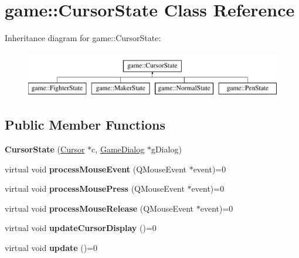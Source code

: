 \hypertarget{classgame_1_1CursorState}{}\section{game\+:\+:Cursor\+State Class Reference}
\label{classgame_1_1CursorState}
Inheritance diagram for game\+:\+:Cursor\+State\+:\begin{figure}[H]
\begin{center}
\leavevmode
\includegraphics[height=2.000000cm]{classgame_1_1CursorState}
\end{center}
\end{figure}
\subsection*{Public Member Functions}
\begin{DoxyCompactItemize}
\item 
\mbox{\label{classgame_1_1CursorState_acd2a923f1ab53c7e89343fcf68afb090}} 
{\bfseries Cursor\+State} (\hyperlink{classgame_1_1Cursor}{Cursor} $\ast$c, \hyperlink{classgame_1_1GameDialog}{Game\+Dialog} $\ast$g\+Dialog)
\item 
\mbox{\label{classgame_1_1CursorState_aae2cb6cb2261d9a4c5919ac61e03e6ee}} 
virtual void {\bfseries process\+Mouse\+Event} (Q\+Mouse\+Event $\ast$event)=0
\item 
\mbox{\label{classgame_1_1CursorState_ac962db2f670e46a9f030a890265a95f6}} 
virtual void {\bfseries process\+Mouse\+Press} (Q\+Mouse\+Event $\ast$event)=0
\item 
\mbox{\label{classgame_1_1CursorState_a29ceddfb5b90c4ef770086b96dc99423}} 
virtual void {\bfseries process\+Mouse\+Release} (Q\+Mouse\+Event $\ast$event)=0
\item 
\mbox{\label{classgame_1_1CursorState_a9fb2f1920e25d1cce5f5ff15e10c561a}} 
virtual void {\bfseries update\+Cursor\+Display} ()=0
\item 
\mbox{\label{classgame_1_1CursorState_a6e7d7419da6c728116ff0d9c4c12444c}} 
virtual void {\bfseries update} ()=0
\end{DoxyCompactItemize}
